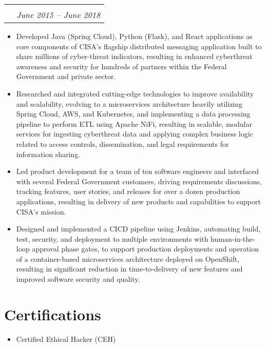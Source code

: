 \documentclass[letterpaper,11pt]{article}
\makeatletter
\newcommand{\resumeSubSubheading}[3]{
  \vspace{8pt}
  \begin{tabular*}{\textwidth}{l@{\extracolsep{\fill}}r}
    \intersemibold{#1} & \\
    \color{lighter}\interlight{\small#3} & \color{lighter}\interlight\textit{\small #2}\\
  \end{tabular*}
}
\newcommand{\resumeItemListStart}{
\begin{itemize}[leftmargin=20pt]}
\newcommand{\resumeItemListEnd}{
\end{itemize}}
\makeatother
\begin{document}
\resumeSubSubheading{Software Engineer \& Technical Lead}{June 2015 -- June 2018}{CISA, Automated Indicator Sharing Platform}
\resumeItemListStart
\item Developed Java (Spring Cloud), Python (Flask), and React applications as core components of CISA's flagship distributed messaging application built to share millions of cyber-threat indicators, resulting in enhanced cyberthreat awareness and security for hundreds of partners within the Federal Government and private sector.
\item Researched and integrated cutting-edge technologies to improve availability and scalability, evolving to a microservices architecture heavily utilizing Spring Cloud, AWS, and Kubernetes, and implementing a data processing pipeline to perform ETL using Apache NiFi, resulting in scalable, modular services for ingesting cyberthreat data and applying complex business logic related to access controls, dissemination, and legal requirements for information sharing.
\item Led product development for a team of ten software engineers and interfaced with several Federal Government customers, driving requirements discussions, tracking features, user stories, and releases for over a dozen production applications, resulting in delivery of new products and capabilities to support CISA's mission.
\item Designed and implemented a CICD pipeline using Jenkins, automating build, test, security, and deployment to multiple environments with human-in-the-loop approval phase gates, to support production deployments and operation of a container-based microservices architecture deployed on OpenShift, resulting in significant reduction in time-to-delivery of new features and improved software security and quality.
\resumeItemListEnd

\section{Certifications}
\begin{itemize}
  \item Certified Ethical Hacker (CEH)
\end{itemize}
\end{document}
